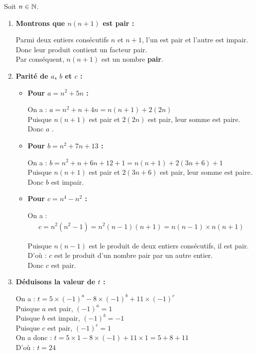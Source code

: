 \documentclass[10pt, a4paper]{article}
\begin{document}
\begin{Solution}[APPLICATION][3]
Soit $n \in \mathbb{N}$.
\begin{enumerate}[leftmargin=*,itemsep=0.5pt]
    \item \textbf{Montrons que $n(n+1)$ est pair :}

    Parmi deux entiers consécutifs $n$ et $n+1$, l'un est pair et l'autre est impair. \\
    Donc leur produit contient un facteur pair. \\
    Par conséquent, $n(n+1)$ est un nombre \textbf{pair}.

    \item \textbf{Parité de $a$, $b$ et $c$ :}
    \begin{itemize}[leftmargin=*,itemsep=0.5pt]
        \item \textbf{Pour $a = n^2 + 5n$ :}
        
        On a : $a = n^2 + n + 4n = n(n+1) + 2(2n)$ \\
        Puisque $n(n+1)$ est pair et $2(2n)$ est pair, leur somme est paire. \\
        Donc $a$ .

        \item \textbf{Pour $b = n^2 + 7n + 13$ :}
        
        On a : $b = n^2 + n + 6n + 12 + 1 = n(n+1) + 2(3n + 6) + 1$ \\
        Puisque $n(n+1)$ est pair et $2(3n+6)$ est pair, leur somme est paire. \\
        Donc $b$ est impair.

        \item \textbf{Pour $c = n^4 - n^2$ :}
        
        On a :         
        \begin{align*}
c = n^2(n^2 - 1)  
 = n^2(n-1)(n+1) 
 = n(n-1) \times n(n+1)
\end{align*}
        
        Puisque $n(n-1)$ est le produit de deux entiers consécutifs, il est pair. \\
        D'où : $c$ est le produit d'un nombre pair par un autre entier. \\
        Donc $c$ est pair.
    \end{itemize}

    \item \textbf{Déduisons la valeur de $t$ :}
    
    On a : $t = 5 \times (-1)^a - 8 \times (-1)^b + 11 \times (-1)^c$ \\
    Puisque $a$ est pair, $(-1)^a = 1$ \\
    Puisque $b$ est impair, $(-1)^b = -1$ \\
    Puisque $c$ est pair, $(-1)^c = 1$ \\
    On a donc :
    $t = 5 \times 1 - 8 \times (-1) + 11 \times 1 
     = 5 + 8 + 11$ \\
    D'où : \quad $t = 24$
\end{enumerate}
\end{Solution}
\end{document}
